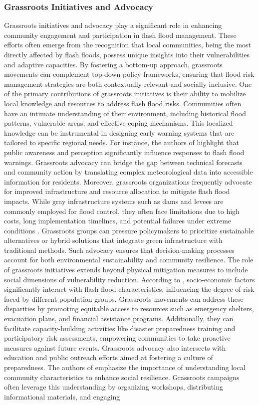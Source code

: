 \subsubsection{Grassroots Initiatives and Advocacy}
Grassroots initiatives and advocacy play a significant role in enhancing community engagement and participation in flash flood management. These efforts often emerge from the recognition that local communities, being the most directly affected by flash floods, possess unique insights into their vulnerabilities and adaptive capacities. By fostering a bottom-up approach, grassroots movements can complement top-down policy frameworks, ensuring that flood risk management strategies are both contextually relevant and socially inclusive. One of the primary contributions of grassroots initiatives is their ability to mobilize local knowledge and resources to address flash flood risks. Communities often have an intimate understanding of their environment, including historical flood patterns, vulnerable areas, and effective coping mechanisms. This localized knowledge can be instrumental in designing early warning systems that are tailored to specific regional needs. For instance, the authors of \citep{Henderson2020} highlight that public awareness and perception significantly influence responses to flash flood warnings. Grassroots advocacy can bridge the gap between technical forecasts and community action by translating complex meteorological data into accessible information for residents. Moreover, grassroots organizations frequently advocate for improved infrastructure and resource allocation to mitigate flash flood impacts. While gray infrastructure systems such as dams and levees are commonly employed for flood control, they often face limitations due to high costs, long implementation timelines, and potential failures under extreme conditions \citep{Abegaz2024}. Grassroots groups can pressure policymakers to prioritize sustainable alternatives or hybrid solutions that integrate green infrastructure with traditional methods. Such advocacy ensures that decision-making processes account for both environmental sustainability and community resilience. The role of grassroots initiatives extends beyond physical mitigation measures to include social dimensions of vulnerability reduction. According to \citep{Khajehei2020}, socio-economic factors significantly interact with flash flood characteristics, influencing the degree of risk faced by different population groups. Grassroots movements can address these disparities by promoting equitable access to resources such as emergency shelters, evacuation plans, and financial assistance programs. Additionally, they can facilitate capacity-building activities like disaster preparedness training and participatory risk assessments, empowering communities to take proactive measures against future events. Grassroots advocacy also intersects with education and public outreach efforts aimed at fostering a culture of preparedness. The authors of \citep{Bodoque2019} emphasize the importance of understanding local community characteristics to enhance social resilience. Grassroots campaigns often leverage this understanding by organizing workshops, distributing informational materials, and engaging 